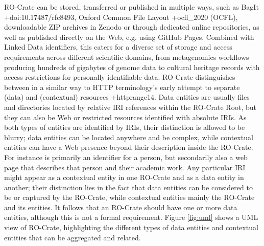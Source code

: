 {{}RO-Crate can be stored, transferred or published in multiple ways, such as BagIt +{}{}{doi:10.17487/rfc8493}, Oxford Common File Layout +{}{}{ocfl_2020} (OCFL), downloadable ZIP archives in Zenodo or through dedicated online repositories, as well as published directly on the Web, e.g. using GitHub Pages. Combined with Linked Data identifiers, this caters for a diverse set of storage and access requirements across different scientific domains, from metagenomics workflows producing hundreds of gigabytes of genome data to cultural heritage records with access restrictions for personally identifiable data.\markdownRendererInterblockSeparator
{}\markdownRendererInterblockSeparator
{}RO-Crate distinguishes between  in a similar way to HTTP terminology's early attempt to separate  (data) and  (contextual) resources +{}{}{httprange14}. Data entities are usually files and directories located by relative IRI references within the RO-Crate Root, but they can also be Web or restricted resources identified with absolute IRIs.\markdownRendererInterblockSeparator
{}As both types of entities are identified by IRIs, their distinction is allowed to be blurry; data entities can be located anywhere and be complex, while contextual entities can have a Web presence beyond their description inside the RO-Crate. For instance  is primarily an identifier for a person, but secondarily also a web page that describes that person and their academic work. \markdownRendererInterblockSeparator
{}Any particular IRI might appear as a contextual entity in one RO-Crate and as a data entity in another; their distinction lies in the fact that data entities can be considered to be  or captured by the RO-Crate, while contextual entities mainly  the RO-Crate and its entities. It follows that an RO-Crate should have one or more data entities, although this is not a formal requirement. \markdownRendererInterblockSeparator
{}Figure \ref{fig:uml} shows a UML view of RO-Crate, highlighting the different types of data entities and contextual entities that can be aggregated and related.\markdownRendererInterblockSeparator
}

